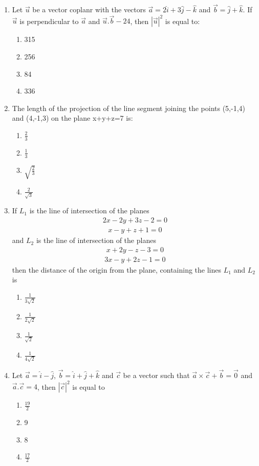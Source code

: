 \begin{enumerate}[label=\arabic*.,ref=\thesubsection.\theenumi]
\item Let $\overrightarrow{u}$ be a vector coplanr with the vectors $\overrightarrow{a}=2\hat{i}+3\hat{j}-\hat{k}$ and 
$\overrightarrow{b}=\hat{j}+\hat{k}$. If $\overrightarrow{u}$ is perpendicular to $\overrightarrow{a}$ and $\overrightarrow{u}.\overrightarrow{b}-24$, then $|\overrightarrow{u}|^2$ is equal to:
\begin{enumerate}
\item 315
\item 256
\item 84
\item 336
\end{enumerate} 

\item The length of the projection of the line segment joining the points (5,-1,4) and (4,-1,3) on the plane x+y+z=7 is:
\begin{enumerate}
\item $\frac{2}{3}$
\item $\frac{1}{3}$
\item $\sqrt{\frac{2}{3}}$
\item $\frac{2}{\sqrt{3}}$
\end{enumerate}

\item If $L_1$ is the line of intersection of the planes
\begin{align*}
2x-2y+3z-2=0
\end{align*}
\begin{align*}
x-y+z+1=0
\end{align*}
and $L_2$ is the line of intersection of the planes
\begin{align*}
x+2y-z-3=0
\end{align*}
\begin{align*}
3x-y+2z-1=0
\end{align*}
then the distance of the origin from the plane, containing the lines $L_1$ and $L_2$ is
\begin{enumerate}
\item $\frac{1}{3\sqrt{2}}$
\item $\frac{1}{2\sqrt{2}}$
\item $\frac{1}{\sqrt{2}}$
\item $\frac{1}{4\sqrt{2}}$
\end{enumerate}

\item Let $\overrightarrow{a}=\hat{i}-\hat{j}$, $\overrightarrow{b}=\hat{i}+\hat{j}+\hat{k}$  and $\overrightarrow{c}$ be a vector such that $\overrightarrow{a} \times \overrightarrow{c}+\overrightarrow{b}=\overrightarrow{0}$ and $\overrightarrow{a}.\overrightarrow{c}=4$, then $|\overrightarrow{c}|^2$ is equal to
\begin{enumerate}
\item $\frac{19}{2}$
\item 9
\item 8
\item $\frac{17}{2}$
\end{enumerate}


\end{enumerate}
